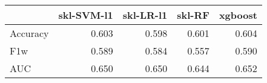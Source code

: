 \begin{tabular}{lrrrr}
\toprule
{} &  skl-SVM-l1 &  skl-LR-l1 &  skl-RF &  xgboost \\
\midrule
Accuracy &       0.603 &      0.598 &   0.601 &    0.604 \\
F1w      &       0.589 &      0.584 &   0.557 &    0.590 \\
AUC      &       0.650 &      0.650 &   0.644 &    0.652 \\
\bottomrule
\end{tabular}
